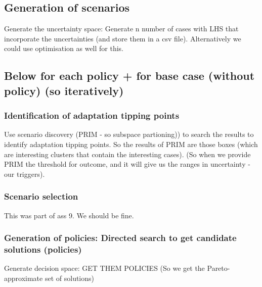 \subsection{Generation of scenarios}
Generate the uncertainty space: Generate n number of cases with LHS that incorporate the uncertainties (and store them in a csv file). Alternatively we could use optimisation as well for this.

\subsection{Below for each policy + for base case (without policy) (so iteratively)}
\subsubsection{Identification of adaptation tipping points}
Use scenario discovery (PRIM - so subspace partioning)) to search the results to identify adaptation tipping points. So the results of PRIM are those boxes (which are interesting clusters that contain the interesting cases). (So when we provide PRIM the threshold for outcome, and it will give us the ranges in uncertainty - our triggers).

\subsubsection{Scenario selection}
This was part of ass 9. We should be fine.

\subsubsection{Generation of policies: Directed search to get candidate solutions (policies)}
Generate decision space: GET THEM POLICIES
(So we get the Pareto-approximate set of solutions)


